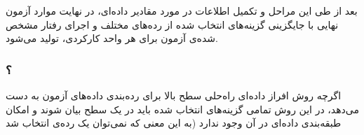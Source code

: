 بعد از طی این مراحل و تکمیل اطلاعات در مورد مقادیر داده‌ای، در نهایت موارد آزمون نهایی با جایگزینی گزینه‌های انتخاب شده از رده‌های مختلف و اجرای رفتار مشخص شده‌ی آزمون برای هر واحد کارکردی، تولید می‌شود.

\subsubsection{؟}
اگرچه روش افراز داده‌ای راه‌حلی سطح بالا برای رده‌بندی داده‌های آزمون به دست می‌دهد، در این روش تمامی گزینه‌های انتخاب شده باید در یک سطح بیان شوند و امکان طبقه‌بندی داده‌ای در آن وجود ندارد (به این معنی که نمی‌توان یک رده‌ی انتخاب شد

